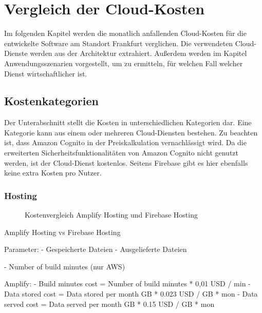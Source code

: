 \chapter{Vergleich der Cloud-Kosten}

Im folgenden Kapitel werden die monatlich anfallenden Cloud-Kosten \autocite{awsPricing} \autocite{gcpPricing} für die entwickelte Software am Standort Frankfurt verglichen. Die verwendeten Cloud-Dienste werden aus der Architektur extrahiert. Außerdem werden im Kapitel Anwendungsszenarien vorgestellt, um zu ermitteln, für welchen Fall welcher Dienst wirtschaftlicher ist.

\section{Kostenkategorien}

Der Unterabschnitt stellt die Kosten in unterschiedlichen Kategorien dar. Eine Kategorie kann aus einem oder mehreren Cloud-Diensten bestehen. Zu beachten ist, dass Amazon Cognito in der Preiskalkulation vernachlässigt wird. Da die erweiterten Sicherheitsfunktionalitäten von Amazon Cognito nicht genutzt werden, ist der Cloud-Dienst kostenlos. Seitens Firebase gibt es hier ebenfalls keine extra Kosten pro Nutzer.

\subsection{Hosting}

\begin{figure}%
    \centering
    \qquad
    \caption{Kostenvergleich Amplify Hosting und Firebase Hosting}%
    \label{kostenvergleichHosting}%
\end{figure}

Amplify Hosting vs Firebase Hosting

Parameter:
- Gespeicherte Dateien
- Ausgelieferte Dateien

- Number of build minutes (nur AWS)


Amplify:
- Build minutes cost = Number of build minutes * 0,01 USD / min
- Data stored cost = Data stored per month GB * 0.023 USD / GB * mon
- Data served cost = Data served per month GB * 0.15 USD / GB * mon

